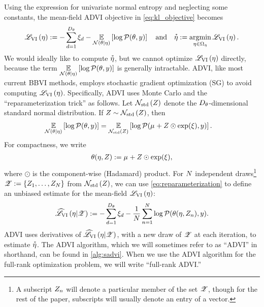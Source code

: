 Using the expression for univariate normal entropy and neglecting some
constants, the mean-field ADVI objective in \cref{eq:kl_objective} becomes
%
\begin{align}\label{eq:kl_objective_advi}
%
\klfullobj{\eta} :=
-\sum_{d=1}^{\thetadim} \etaxi[d] -
\expect{\normal{\theta}{\eta}}{\log \p(\theta, \y)}
\quad\textrm{and}\quad
\etastar := \argmin_{\eta \in \etadom} \klfullobj{\eta}.
%
\end{align}
%
We would ideally like to compute $\accentset{*}{\eta}$, but we cannot optimize
$\mathscr{L}_{\mathrm{VI}}\left(\eta\right)$ directly, because the term
$\underset{\mathcal{N}\left(\theta \vert \eta\right)}{\mathbb{E}}\left[\log \mathcal{P}(\theta, y)\right]$ is generally intractable.
ADVI, like most current BBVI methods, employs stochastic gradient optimization
(SG) to avoid computing $\mathscr{L}_{\mathrm{VI}}\left(\eta\right)$.  Specifically, ADVI uses Monte Carlo
and the ``reparameterization trick'' \citep{mohamed:2020:mcgradients} as
follows. Let $\mathcal{N}_{\mathrm{std}}\left(Z\right)$ denote the $D_{\theta}$-dimensional standard normal
distribution. If $Z \sim \mathcal{N}_{\mathrm{std}}\left(Z\right)$, then
%
\begin{align}\label{eq:reparameterization}
%
\expect{\normal{\theta}{\eta}}{\log \p(\theta, \y)} ={}&
    \expect{\normz}{\log \p(\etamu + \z \odot \exp(\etaxi), \y)}.
%
\end{align}
%
For compactness, we write 
%
\begin{align}\label{eq:reparameterization_theta}
    \theta(\eta, Z) := \mu_{} + Z \odot \exp(\xi_{}),
\end{align}
%
where $\odot$ is the component-wise (Hadamard) product. 
For $N$ independent
draws\footnote{A subscript $Z_n$ will denote a particular member of the set
$\mathscr{Z}$, though for the rest of the paper, subscripts will usually denote an entry
of a vector.} $\mathscr{Z} := \{ Z_1, \ldots, Z_N \}$ from $\mathcal{N}_{\mathrm{std}}\left(Z\right)$, we can use
\cref{eq:reparameterization} to define an unbiased estimate for the mean-field
$\mathscr{L}_{\mathrm{VI}}\left(\eta\right)$:
%
\begin{align}\label{eq:reparameterization_kl}
%
\klobj{\eta | \Z} := 
-\sum_{d=1}^{\thetadim} \etaxi[d] -
\meann \log \p(\theta(\eta, \z_n), \y).
%
\end{align}
%
ADVI uses derivatives of $\widehat{\mathscr{L}}_{\mathrm{VI}}\left(\eta | \mathscr{Z}\right)$, with a new draw of $\mathscr{Z}$ at each
iteration, to estimate $\accentset{*}{\eta}$. The ADVI algorithm, which we will sometimes
refer to as ``ADVI'' in shorthand, can be found in \cref{alg:sadvi}. When we use
the ADVI algorithm for the full-rank optimization problem, we will write
``full-rank ADVI.''


\vspace{1em}
